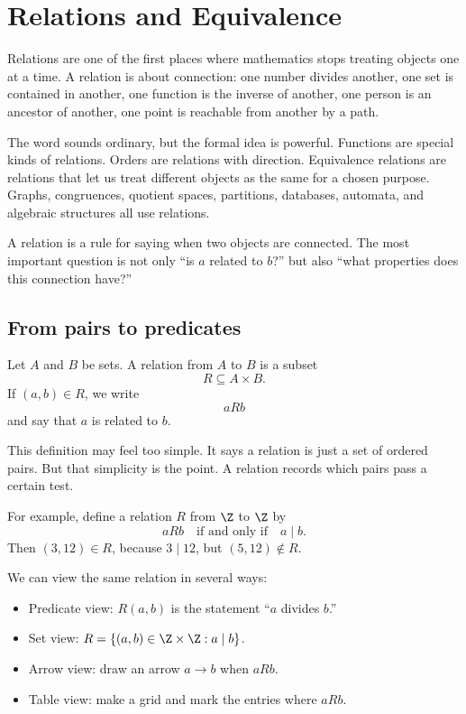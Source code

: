 \section{Relations and Equivalence}

Relations are one of the first places where mathematics stops treating objects one at a time. A relation is about connection: one number divides another, one set is contained in another, one function is the inverse of another, one person is an ancestor of another, one point is reachable from another by a path.

The word sounds ordinary, but the formal idea is powerful. Functions are special kinds of relations. Orders are relations with direction. Equivalence relations are relations that let us treat different objects as the same for a chosen purpose. Graphs, congruences, quotient spaces, partitions, databases, automata, and algebraic structures all use relations.

\begin{focusbox}
A relation is a rule for saying when two objects are connected. The most important question is not only ``is $a$ related to $b$?'' but also ``what properties does this connection have?''
\end{focusbox}

\subsection{From pairs to predicates}

Let $A$ and $B$ be sets. A relation from $A$ to $B$ is a subset
\[
R\subseteq A\times B.
\]
If $(a,b)\in R$, we write
\[
aRb
\]
and say that $a$ is related to $b$.

This definition may feel too simple. It says a relation is just a set of ordered pairs. But that simplicity is the point. A relation records which pairs pass a certain test.

For example, define a relation $R$ from $\Z$ to $\Z$ by
\[
aRb\quad\text{if and only if}\quad a\mid b.
\]
Then $(3,12)\in R$, because $3\mid 12$, but $(5,12)\notin R$.

We can view the same relation in several ways:

\begin{itemize}
\item Predicate view: $R(a,b)$ is the statement ``$a$ divides $b$.''
\item Set view: $R=\{(a,b)\in\Z\times\Z:a\mid b\}$.
\item Arrow view: draw an arrow $a\to b$ when $aRb$.
\item Table view: make a grid and mark the entries where $aRb$.
\end{itemize}

